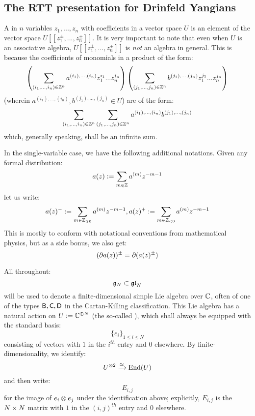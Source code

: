         \begin{definition} \label{def: quantum_determinants}
            
        \end{definition}

    \subsection{The RTT presentation for Drinfeld Yangians} \label{subsection: RTT_presentation_for_drinfeld_yangians}
        A  in $n$ variables $z_1, ..., z_n$ with coefficients in a vector space $U$ is an element of the vector space $U[\![z_1^{\pm}, ..., z_n^{\pm}]\!]$. It is very important to note that even when $U$ is an associative algebra, $U[\![z_1^{\pm}, ..., z_n^{\pm}]\!]$ is \textit{not} an algebra in general. This is because the coefficients of monomials in a product of the form:
            $$\left( \sum_{(i_1, ..., i_n) \in \mathbb{Z}^n} a^{(i_1), ..., (i_n)} z_1^{i_1} ... z_n^{i_n} \right) \left( \sum_{(j_1, ..., j_n) \in \mathbb{Z}^n} b^{(j_1), ..., (j_n)} z_1^{j_1} ... z_n^{j_n} \right)$$
        (wherein $a^{(i_1), ..., (i_n)}, b^{(j_1), ..., (j_n)} \in U$) are of the form:
            $$\sum_{(i_1, ..., i_n) \in \mathbb{Z}^n} \sum_{(j_1, ..., j_n) \in \mathbb{Z}^n} a^{(i_1), ..., (i_n)} b^{(j_1), ..., (j_n)}$$
        which, generally speaking, shall be an infinite sum.
    
        In the single-variable case, we have the following additional notations. Given any formal distribution:
            $$a(z) := \sum_{m \in \mathbb{Z}} a^{(m)} z^{-m - 1}$$
        let us write:
            $$a(z)^- := \sum_{m \in \mathbb{Z}_{\geqslant 0}} a^{(m)} z^{-m - 1}, a(z)^+ := \sum_{m \in \mathbb{Z}_{< 0}} a^{(m)} z^{-m - 1}$$
        This is mostly to conform with notational conventions from mathematical physics, but as a side bonus, we also get:
            $$(\partial a(z))^{\pm} = \partial( a(z)^{\pm} )$$
    
        All throughout:
            $$\mathfrak{g}_N \subset \mathfrak{gl}_N$$
        will be used to denote a finite-dimensional simple Lie algebra over $\mathbb{C}$, often of one of the types $\mathsf{B}, \mathsf{C}, \mathsf{D}$ in the Cartan-Killing classification. This Lie algebra has a natural action on $U := \mathbb{C}^{\oplus N}$ (the so-called ), which shall always be equipped with the standard basis:
            $$\{e_i\}_{1 \leq i \leq N}$$
        consisting of vectors with $1$ in the $i^{th}$ entry and $0$ elsewhere. By finite-dimensionality, we identify:
            $$U^{\tensor 2} \xrightarrow[]{\cong} \End(U)$$
        and then write:
            $$E_{i, j}$$
        for the image of $e_i \tensor e_j$ under the identification above; explicitly, $E_{i, j}$ is the $N \x N$ matrix with $1$ in the $(i, j)^{th}$ entry and $0$ elsewhere.
        
